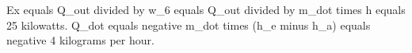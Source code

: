 Ex equals Q_out divided by w_6 equals Q_out divided by m_dot times h equals 25 kilowatts.  
Q_dot equals negative m_dot times (h_e minus h_a) equals negative 4 kilograms per hour.